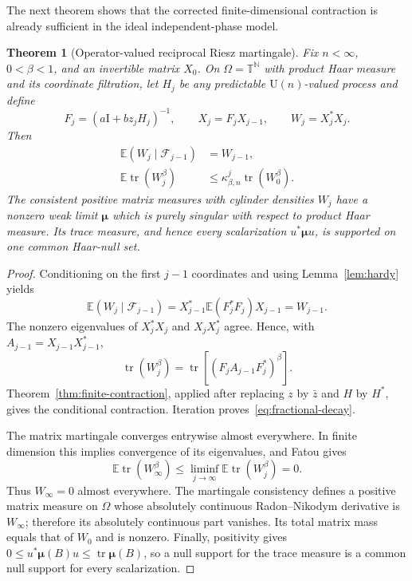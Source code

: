 \documentclass[11pt]{article}
\newtheorem{theorem}{Theorem}[section]
\theoremstyle{remark}
\newcommand{\T}{\mathbb T}
\newcommand{\Id}{\mathrm I}
\newcommand{\tr}{\operatorname{tr}}
\newcommand{\U}{\mathrm U}
\begin{document}
The next theorem shows that the corrected finite-dimensional contraction is
already sufficient in the ideal independent-phase model.

\begin{theorem}[Operator-valued reciprocal Riesz martingale]
\label{thm:torus-singularity}
Fix $n<\infty$, $0<\beta<1$, and an invertible matrix $X_0$.  On
$\Omega=\T^{\mathbb N}$ with product Haar measure and its coordinate
filtration, let $H_j$ be any predictable $\U(n)$-valued process and define
\begin{equation}
 F_j=(a\Id+bz_jH_j)^{-1},\qquad
 X_j=F_jX_{j-1},\qquad
 W_j=X_j^*X_j.
 \label{eq:martingale-recursion}
\end{equation}
Then
\begin{align}
 \mathbb E(W_j\mid\mathcal F_{j-1})&=W_{j-1},
 \label{eq:matrix-martingale}\\
 \mathbb E\tr(W_j^\beta)&\leq
 \kappa_{\beta,n}^j\tr(W_0^\beta).
 \label{eq:fractional-decay}
\end{align}
The consistent positive matrix measures with cylinder densities $W_j$ have
a nonzero weak limit $\boldsymbol\mu$ which is purely singular with respect
to product Haar measure.  Its trace measure, and hence every scalarization
$u^*\boldsymbol\mu u$, is supported on one common Haar-null set.
\end{theorem}

\begin{proof}
Conditioning on the first $j-1$ coordinates and using
Lemma~\ref{lem:hardy} yields
\[
 \mathbb E(W_j\mid\mathcal F_{j-1})
 =X_{j-1}^*\mathbb E(F_j^*F_j)X_{j-1}=W_{j-1}.
\]
The nonzero eigenvalues of $X_j^*X_j$ and $X_jX_j^*$ agree.  Hence, with
$A_{j-1}=X_{j-1}X_{j-1}^*$,
\[
 \tr(W_j^\beta)
 =\tr[(F_jA_{j-1}F_j^*)^\beta].
\]
Theorem~\ref{thm:finite-contraction}, applied after replacing $z$ by
$\bar z$ and $H$ by $H^*$, gives the conditional contraction.  Iteration
proves~\eqref{eq:fractional-decay}.

The matrix martingale converges entrywise almost everywhere.  In finite
dimension this implies convergence of its eigenvalues, and Fatou gives
\[
 \mathbb E\tr(W_\infty^\beta)
 \leq\liminf_{j\to\infty}\mathbb E\tr(W_j^\beta)=0.
\]
Thus $W_\infty=0$ almost everywhere.  The martingale consistency defines a
positive matrix measure on $\Omega$ whose absolutely continuous
Radon--Nikodym derivative is $W_\infty$; therefore its absolutely continuous
part vanishes.  Its total matrix mass equals that of $W_0$ and is nonzero.
Finally, positivity gives
$0\leq u^*\boldsymbol\mu(B)u\leq\tr\boldsymbol\mu(B)$, so a null support for
the trace measure is a common null support for every scalarization.
\end{proof}
\end{document}
